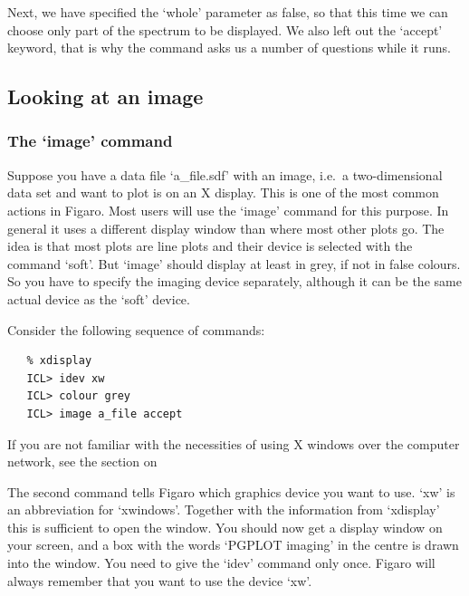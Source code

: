    Next, we have specified the `whole' parameter as false, so that
   this time we can choose only part of the spectrum to be displayed. We
   also left out the `accept' keyword, that is why the command asks us
   a number of questions while it runs.


\subsection{\label{lookimag}Looking at an image}


\subsubsection{\label{lookimagimage}The `image' command}

   Suppose you have a data file `a\_file.sdf' with an image, i.e.\ a
   two-dimensional data set and want to plot is on an X display. This is
   one of the most common actions in Figaro. Most users will use the
   `image' command for this purpose. In general it uses a different
   display window than where most other plots go. The idea is that most
   plots are line plots and their device is selected with the command
   `soft'. But `image' should display at least in grey, if not in
   false colours. So you have to specify the imaging device separately,
   although it can be the same actual device as the `soft' device.

   Consider the following sequence of commands:

\begin{verbatim}
   % xdisplay
   ICL> idev xw
   ICL> colour grey
   ICL> image a_file accept
\end{verbatim}

   If you are not familiar with the necessities of using X windows over
   the computer network, see
   {the section on }

   The second command tells Figaro which graphics device you want to
   use. `xw' is an abbreviation for `xwindows'. Together with the
   information from `xdisplay' this is sufficient to open the window.
   You should now get a display window on your screen, and a box with
   the words `PGPLOT imaging' in the centre is drawn into the window.
   You need to give the `idev' command only once. Figaro will always
   remember that you want to use the device `xw'.

